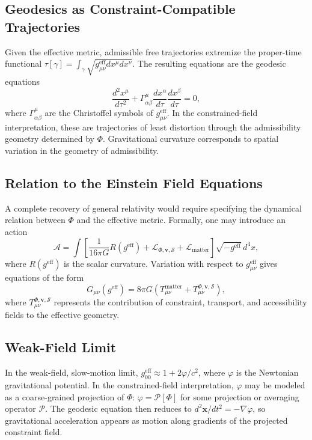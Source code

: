 \documentclass[11pt, a4paper, twocolumn]{article}
\newcommand{\Sfield}{\mathcal{S}}
\begin{document}
\subsection{Geodesics as Constraint-Compatible Trajectories}

Given the effective metric, admissible free trajectories extremize the
proper-time functional $\tau[\gamma] = \int_\gamma \sqrt{g_{\mu\nu}^{\mathrm{eff}}dx^\mu dx^\nu}$.
The resulting equations are the geodesic equations
\[
    \frac{d^2 x^\mu}{d\tau^2}
    +
    \Gamma^\mu_{\alpha\beta}
    \frac{dx^\alpha}{d\tau}
    \frac{dx^\beta}{d\tau}
    =
    0,
\]
where $\Gamma^\mu_{\alpha\beta}$ are the Christoffel symbols of
$g_{\mu\nu}^{\mathrm{eff}}$. In the constrained-field interpretation, these are
trajectories of least distortion through the admissibility geometry determined
by $\Phi$. Gravitational curvature corresponds to spatial variation in the
geometry of admissibility.

\subsection{Relation to the Einstein Field Equations}

A complete recovery of general relativity would require specifying the dynamical
relation between $\Phi$ and the effective metric. Formally, one may introduce an
action
\[
    \mathcal{A}
    =
    \int
    \left[
        \frac{1}{16\pi G}R(g^{\mathrm{eff}})
        +
        \mathcal{L}_{\Phi,\mathbf{v},\Sfield}
        +
        \mathcal{L}_{\mathrm{matter}}
    \right]
    \sqrt{-g^{\mathrm{eff}}}\,d^4x,
\]
where $R(g^{\mathrm{eff}})$ is the scalar curvature. Variation with respect to
$g^{\mathrm{eff}}_{\mu\nu}$ gives equations of the form
\[
    G_{\mu\nu}(g^{\mathrm{eff}})
    =
    8\pi G
    \left(
        T_{\mu\nu}^{\mathrm{matter}}
        +
        T_{\mu\nu}^{\Phi,\mathbf{v},\Sfield}
    \right),
\]
where $T_{\mu\nu}^{\Phi,\mathbf{v},\Sfield}$ represents the contribution of
constraint, transport, and accessibility fields to the effective geometry.

\subsection{Weak-Field Limit}

In the weak-field, slow-motion limit, $g_{00}^{\mathrm{eff}} \approx 1 +
2\varphi/c^2$, where $\varphi$ is the Newtonian gravitational potential. In the
constrained-field interpretation, $\varphi$ may be modeled as a coarse-grained
projection of $\Phi$: $\varphi = \mathcal{P}[\Phi]$ for some projection or
averaging operator $\mathcal{P}$. The geodesic equation then reduces to
$d^2\mathbf{x}/dt^2 = -\nabla\varphi$, so gravitational acceleration appears as
motion along gradients of the projected constraint field.
\end{document}
